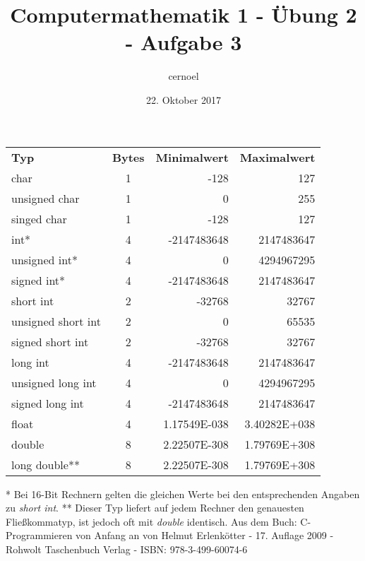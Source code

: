 \documentclass[a4paper,12pt,ngerman,oneside]{article}
\title{Computermathematik 1 - Übung 2 - Aufgabe 3}
\date{22. Oktober 2017}
\author{cernoel}
\begin{document}
 
  \pagestyle{fancy} %
  \fancyhf{} %
  \centering %
  \begin{tabular}{l c r r}
    \rowcolor{gray!50} %
    \textbf{Typ} 		& \textbf{Bytes} & \textbf{Minimalwert} & \textbf{Maximalwert} 	\\
    char 				& 1	& -128			& 127 			\\ 
    unsigned char		& 1	& 0				& 255			\\
    singed char		& 1	& -128			& 127			\\
    int*				& 4	& -2147483648		& 2147483647		\\
    unsigned int*		& 4	& 0				& 4294967295		\\
    signed int*		& 4	& -2147483648		& 2147483647		\\
    short int			& 2	& -32768			& 32767			\\
    unsigned short int	& 2	& 0				& 65535			\\
    signed short int	& 2	& -32768			& 32767			\\
    long int			& 4	& -2147483648		& 2147483647		\\
    unsigned long int	& 4	& 0				& 4294967295		\\
    signed long int	& 4	& -2147483648		& 2147483647		\\
    float				& 4	& 1.17549E-038	& 3.40282E+038	\\
    double			& 8	& 2.22507E-308	& 1.79769E+308	\\
    long double**		& 8	& 2.22507E-308	& 1.79769E+308	\\
  \end{tabular}
  \break
  \begin{flushleft} %
    * Bei 16-Bit Rechnern gelten die gleichen Werte bei den entsprechenden
    Angaben zu \textit{short int}. \break
    \break
    ** Dieser Typ liefert auf jedem Rechner den genauesten Fließkommatyp, ist
    jedoch oft mit \textit{double} identisch.
    \break
    \break
    \tiny{Aus dem Buch: C-Programmieren von Anfang an von Helmut Erlenkötter - 17. Auflage 2009
      - Rohwolt Taschenbuch Verlag - ISBN: 978-3-499-60074-6}
  \end{flushleft}
\end{document}
